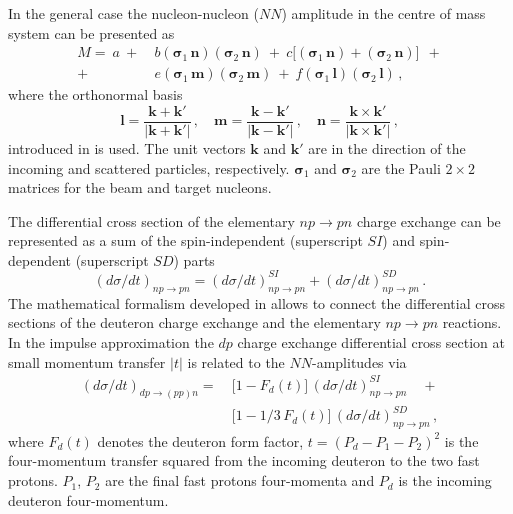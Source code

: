 \documentclass[twocolumn,epjc3]{svjour3}
\newcommand{\np}     {\ensuremath{np \rightarrow pn}\xspace}
\newcommand{\dpchex} {\ensuremath{dp \rightarrow (pp)n}\xspace}
\begin{document}
In the general case the nucleon-nucleon ($NN$) amplitude in the centre of mass
system can be presented as \cite{gla02}
\begin{equation}
  \label{eq:mat_full}
  \begin{split}
    M =\ a\ +\ &b
    (\boldsymbol{\sigma}_1\,\mathbf{n})
    (\boldsymbol{\sigma}_2\,\mathbf{n})\ +\ c\bigl[
    (\boldsymbol{\sigma}_1\,\mathbf{n}) +
    (\boldsymbol{\sigma}_2\,\mathbf{n})\bigr]\ \ + \\
    +\ &e
    (\boldsymbol{\sigma}_1\,\mathbf{m})
    (\boldsymbol{\sigma}_2\,\mathbf{m})\ +\ f
    (\boldsymbol{\sigma}_1\,\mathbf{l})
    (\boldsymbol{\sigma}_2\,\mathbf{l})\,,
  \end{split}
\end{equation}
where the orthonormal basis
\begin{equation}
  \mathbf{l} =
  \frac{\mathbf{k} + \mathbf{k}'}{|\mathbf{k} + \mathbf{k}'|}\,, \quad
  \mathbf{m} =
  \frac{\mathbf{k} - \mathbf{k}'}{|\mathbf{k} - \mathbf{k}'|}\,, \quad
  \mathbf{n} =
  \frac{\mathbf{k} \times \mathbf{k}'}{|\mathbf{k} \times \mathbf{k}'|}\,,
\end{equation}
introduced in \cite{gol66} is used. The unit vectors $\mathbf{k}$ and
$\mathbf{k}'$ are in the direction of the incoming and scattered particles,
respectively. $\boldsymbol{\sigma}_1$ and $\boldsymbol{\sigma}_2$ are the Pauli
$2\times2$ matrices for the beam and target nucleons.


The differential cross section of the elementary \np charge exchange can be
represented as a sum of the spin-independent (superscript $SI$) and
spin-dependent (superscript $SD$) parts
\begin{equation}
  \label{eq:np_sum}
  (d\sigma/dt)_{\np} = (d\sigma/dt)^{SI}_{\np} + (d\sigma/dt)^{SD}_{\np}\,.
\end{equation}
The mathematical formalism developed in \cite{dea72, dea72_2, bug87} allows to
connect the differential cross sections of the deuteron charge exchange and the
elementary \np reactions. In the impulse approximation the $dp$ charge exchange
differential cross section at small momentum transfer $|t|$ is related to the
$NN$-amplitudes via
\begin{equation}
  \label{eq:dp_13np}
  \begin{split}
    (d\sigma/dt)_{\dpchex} =\ &\bigl[1 - F_d(t)\bigr]\,(d\sigma/dt)^{SI}_{\np}
    \quad + \\
    &\bigl[1 - 1/3\,F_d(t)\bigr]\,(d\sigma/dt)^{SD}_{\np}\,,
  \end{split}
\end{equation}
where $F_d(t)$ denotes the deuteron form factor, $t = (P_d - P_1 - P_2)^2$ is
the four-momentum transfer squared from the incoming deuteron to the two fast
protons. $P_1$, $P_2$ are the final fast protons four-momenta and $P_d$ is the
incoming deuteron four-momentum.
\end{document}
